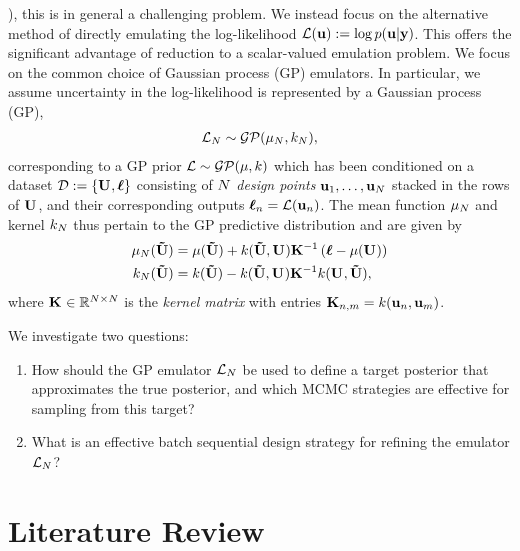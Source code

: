 \documentclass[12pt]{article}
\begin{document}
\cite{Liu_West_dynamic_emulation}), this is in general a challenging problem. We instead focus on the alternative 
method of directly emulating the log-likelihood $\llik(\bpar) := \log p(\bpar|\dataOut)$. This offers the significant advantage of reduction to a scalar-valued emulation 
problem. We focus on the common choice of Gaussian process (GP) emulators. 
In particular, we assume uncertainty in the log-likelihood is represented by a Gaussian 
process (GP), 
\begin{align}
\llik_{\Ndesign} \sim \GP(\GPMeanPred[\Ndesign], \GPKerPred[\Ndesign]),
\end{align}
corresponding to a GP prior $\llik \sim \GP(\GPMean, \GPKer)$ which has been conditioned on a dataset 
$\designData := \{\designMat[], \designOutLik\}$ consisting of $\Ndesign$ \textit{design points} 
$\bpar_1, \dots, \bpar_{\Ndesign}$ stacked in the rows of $\designMat[]$, and their corresponding outputs $\designOutLik_{\designIdx} = \llik(\bpar_{\designIdx})$. The 
mean function $\GPMeanPred[\Ndesign]$ and kernel $\GPKerPred[\Ndesign]$ thus pertain to the GP predictive distribution and are given by 
\begin{align}
\GPMeanPred[\Ndesign](\newInputMat) &= \GPMean(\newInputMat) + \GPKer(\newInputMat, \designMat[]) \KerMat[]^{-1} \left(\designOutLik - \GPMean(\designMat[]) \right) \label{kriging_eqns} \\
\GPKerPred[\Ndesign](\newInputMat) &= \GPKer(\newInputMat) - \GPKer(\newInputMat, \designMat[]) \KerMat[]^{-1} \GPKer(\designMat[], \newInputMat),
\end{align}
where $\KerMat[] \in \R^{\Ndesign \times \Ndesign}$ is the \textit{kernel matrix} with entries $\KerMat[n,m] = \GPKer(\bpar_n, \bpar_m)$. 

We investigate two questions: 
\begin{enumerate}
\item How should the GP emulator $\llik_{\Ndesign}$ be used to define a target posterior that approximates the true posterior, and which MCMC 
strategies are effective for sampling from this target?
\item What is an effective batch sequential design strategy for refining the emulator $\llik_{\Ndesign}$? 
\end{enumerate}

\section{Literature Review}
\end{document}
